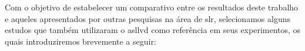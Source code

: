 
Com o objetivo de estabelecer um comparativo entre os resultados deste trabalho e aqueles apresentados por outras pesquisas na área de \acrfull{slr}, selecionamos alguns estudos que também utilizaram o \acrshort{asllvd} como referência em seus experimentos, os quais introduziremos brevemente a seguir:



